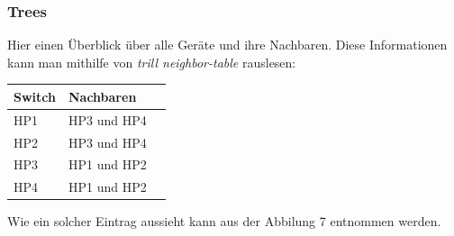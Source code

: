 \documentclass[a4,12pt]{scrartcl}
\begin{document}
\subsubsection{Trees}
Hier einen Überblick über alle Geräte und ihre Nachbaren. Diese Informationen kann man mithilfe von \textit{trill neighbor-table} rauslesen: 
\begin{center}
    \begin{tabular}{@{} l l r@{}}\toprule    
    {Switch} & {Nachbaren}\\ \midrule
    HP1 & HP3 und HP4\\ \addlinespace
    HP2 & HP3 und HP4\\ \addlinespace
    HP3 & HP1 und HP2\\ \addlinespace
    HP4 & HP1 und HP2\\ 
    \bottomrule
    \end{tabular}
\end{center}
Wie ein solcher Eintrag aussieht kann aus der Abbilung 7 entnommen werden. 
\newpage
\end{document}
